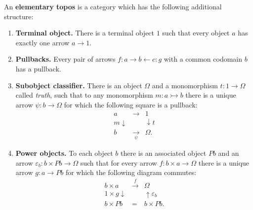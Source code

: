 An \textbf{elementary topos} is a category which has the following additional structure:

\begin{enumerate}
\item[6.] \textbf{Terminal object.} There is a terminal object $1$ such that every object $a$ has exactly one arrow $a \to 1$.

\item[7.] \textbf{Pullbacks.} Every pair of arrows $f : a \to b \leftarrow c : g$ with a common codomain $b$ has a pullback.

\item[8.] \textbf{Subobject classifier.} There is an object $\Omega$ and a monomorphism $t : 1 \to \Omega$ called \textit{truth}, such that to any monomorphism $m : a \rightarrowtail b$ there is a unique arrow $\psi : b \to \Omega$ for which the following square is a pullback:
$$\begin{array}{ccc}
a & \to & 1 \\
{\scriptstyle m}\downarrow & & \downarrow{\scriptstyle t} \\
b & \underset{\psi}{\to} & \Omega .
\end{array}$$

\item[9.] \textbf{Power objects.} To each object $b$ there is an associated object $Pb$ and an arrow $\varepsilon_b : b \times Pb \to \Omega$ such that for every arrow $f : b \times a \to \Omega$ there is a unique arrow $g : a \to Pb$ for which the following diagram commutes:
$$\begin{array}{ccc}
b \times a & \xrightarrow{f} & \Omega \\
{\scriptstyle 1 \times g}\downarrow & & \uparrow{\scriptstyle \varepsilon_b} \\
b \times Pb & = & b \times Pb .
\end{array}$$
\end{enumerate}
